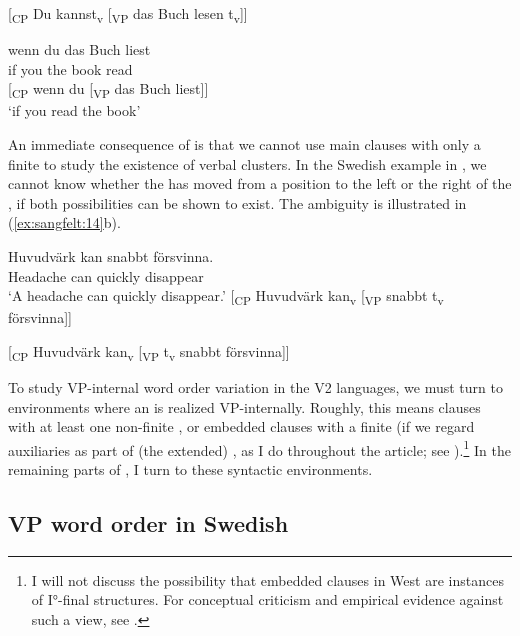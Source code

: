\documentclass[output=paper, colorlinks, citecolor=brown]{langscibook}
\begin{document}
[\textsubscript{CP} Du kannst\textsubscript{v} [\textsubscript{VP} {das} {Buch} lesen t\textsubscript{v}]]

\ex\label{ex:sangfelt:13b}
\gll wenn du das Buch liest \\
 if you the book read\\

[\textsubscript{CP} wenn du [\textsubscript{VP} {das} {Buch} liest]]\\

\glt ‘if you read the book’
\z 
\z 

An immediate consequence of    is that we cannot use main clauses with only a finite  to study the existence of verbal clusters. In the Swedish example in , we cannot know whether the  has moved from a position to the left or the right of the , if both possibilities can be shown to exist. The ambiguity is illustrated in (\ref{ex:sangfelt:14}b).

\ea {}\label{ex:sangfelt:14}
\ea \label{ex:sangfelt:14a}
\gll Huvudvärk kan {snabbt} försvinna.  \\
 Headache can quickly disappear \\
\glt ‘A headache can quickly disappear.’
\ex\label{ex:sangfelt:14b}
[\textsubscript{CP} Huvudvärk kan\textsubscript{v} [\textsubscript{VP} snabbt t\textsubscript{v} försvinna]]

[\textsubscript{CP} Huvudvärk kan\textsubscript{v} [\textsubscript{VP} t\textsubscript{v} snabbt försvinna]]
\z 
\z

To study VP-internal word order variation in the  V2 languages, we must turn to environments where an  is realized VP-internally. Roughly, this means clauses with at least one non-finite , or embedded clauses with a finite  (if we regard auxiliaries as part of (the extended) , as I do throughout the article; see ).\footnote{I will not discuss the possibility that embedded clauses in West  are instances of I°-final structures. For conceptual criticism and empirical evidence against such a view, see \citet[54–68]{Haider2010}.} In the remaining parts of , I turn to these syntactic environments.

\subsection{VP word order in Swedish}\label{sec:sangfelt:3.2}
\end{document}
